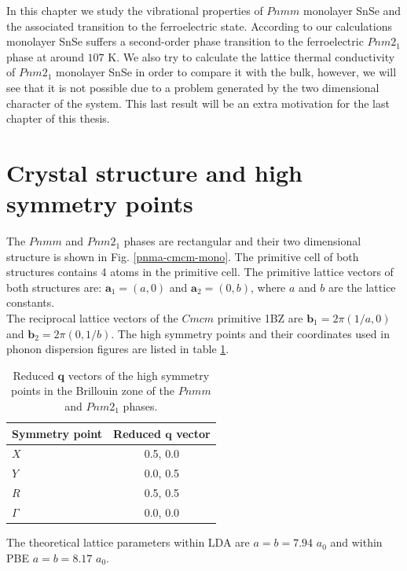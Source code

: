 In this chapter we study the vibrational properties of $Pnmm$ monolayer SnSe and the associated transition to the 
ferroelectric state. According to our calculations monolayer SnSe suffers a second-order phase transition to the 
ferroelectric $Pnm2_{1}$ phase at around $107$ K. We also try to calculate the lattice thermal conductivity of 
$Pnm2_{1}$ monolayer SnSe in order to compare it with the bulk, however, we will see that it is not possible due to 
a problem generated by the two dimensional character of the system. This last result will be an extra motivation for 
the last chapter of this thesis.

\section{Crystal structure and high symmetry points}

The $Pnmm$ and $Pnm2_{1}$ phases are rectangular and their two dimensional structure is shown in 
Fig. \ref{pnma-cmcm-mono}. The primitive cell of both structures contains 4 atoms in the primitive cell. The 
primitive lattice vectors of both structures are: $\mathbf{a}_{1}=(a,0)$ and $\mathbf{a}_{2}=(0,b)$, where $a$ and 
$b$ are the lattice constants. \\

The reciprocal lattice vectors of the $Cmcm$ primitive 1BZ are $\mathbf{b}_{1}=2\pi(1/a,0)$ and 
$\mathbf{b}_{2}=2\pi(0,1/b)$. The high symmetry points and their coordinates used in phonon dispersion figures are 
listed in table \ref{qpoints-mono}.
\begin{table}
\begin{center}
\begin{tabular*}{0.45\textwidth}{l c}
 \hline
 \hline
             Symmetry point  & Reduced $\mathbf{q}$ vector  \\
 \hline
 $X$                  &  0.5, 0.0 \\
 $Y$                  &  0.0, 0.5 \\
 $R$                  &  0.5, 0.5  \\
 $\Gamma$             &  0.0, 0.0  \\
 \hline
 \hline
\end{tabular*}
\end{center}
\caption{Reduced $\mathbf{q}$ vectors of the high symmetry points in the Brillouin zone of the $Pnmm$ and $Pnm2_{1}$ 
phases.}
\label{qpoints-mono}
\end{table}
The theoretical lattice parameters within LDA are $a=b=7.94$ $a_{0}$ and within PBE $a=b=8.17$ $a_{0}$. 

